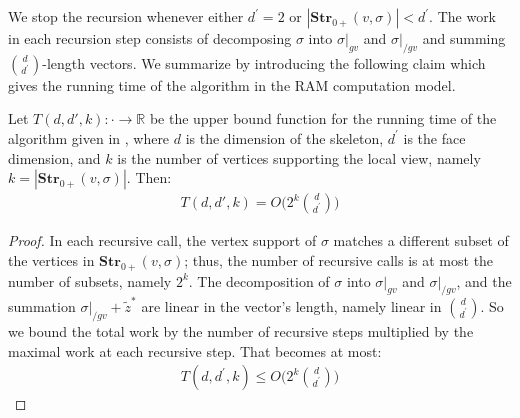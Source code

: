 We stop the recursion whenever either $d^{\prime}=2$ or $|\mathbf{Str}_{0+}(v, \sigma )| < d^{\prime}$. The work in each recursion step consists of decomposing $\sigma$ into $\sigma|_{gv}$ and $\sigma|_{/gv}$ and summing ${ d \choose d^{\prime} }$-length vectors. We summarize by introducing the following claim which gives the running time of the algorithm in the RAM computation model.
\begin{claim}
  Let $ T(d, d', k) : \cdot \rightarrow \mathbb{R} $ be the upper bound function for the running time of the algorithm given in , where $d$ is the dimension of the skeleton, $d^{\prime}$ is the face dimension, and $k$ is the number of vertices supporting the local view, namely $k = |\mathbf{Str}_{0+}(v, \sigma )|$. Then:
  \begin{equation*}
    \begin{split}
      T(d, d', k) = O\bigl( 2^{k} { d \choose d^{\prime} } \bigr)
    \end{split}
  \end{equation*}
\end{claim}
\begin{proof}
In each recursive call, the vertex support of $\sigma$ matches a different subset of the vertices in $\mathbf{Str}_{0+}(v, \sigma)$; thus, the number of recursive calls is at most the number of subsets, namely $2^{k}$. The decomposition of $\sigma$ into $\sigma|_{gv}$ and $\sigma|_{/gv}$, and the summation $\sigma|_{/gv} + \tilde{z}^{*}$ are linear in the vector's length, namely linear in ${d \choose d^{\prime}}$. So we bound the total work by the number of recursive steps multiplied by the maximal work at each recursive step. That becomes at most:
\begin{equation*}
  \begin{split}
    T(d,d^{\prime},k) \le O\bigl( 2^{k} { d \choose d^{\prime} } \bigr) 
  \end{split}
\end{equation*}
\end{proof}





